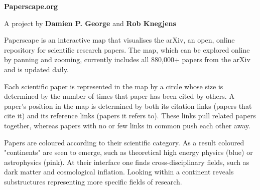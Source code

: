 \documentclass[11pt]{article}
\begin{document}
{\Huge\bf Paperscape.org}

{\large A project by {\bf Damien P. George} and {\bf Rob Knegjens}}


Paperscape is an interactive map that visualises the arXiv, an open, online repository for scientific research papers. 
The map, which can be explored online by panning and zooming, currently includes all 880,000+ papers from the arXiv and is updated daily.


Each scientific paper is represented in the map by a circle whose size is determined by the number of times that paper has been cited by others.
A paper's position in the map is determined by both its citation links (papers that cite it) and its reference links (papers it refers to).
These links pull related papers together, whereas papers with no or few links in common push each other away.



Papers are coloured according to their scientific category.
As a result coloured "continents" are seen to emerge, such as theoretical high energy physics (blue) or astrophysics (pink).
At their interface one finds cross-disciplinary fields, such as dark matter and cosmological inflation.
Looking within a continent reveals substructures representing more specific fields of research.
\end{document}
